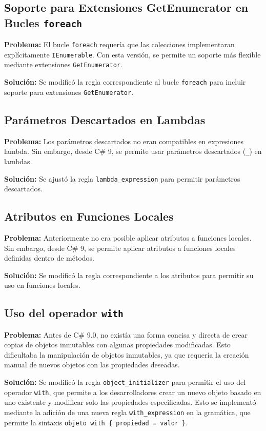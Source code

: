 \subsection*{Soporte para Extensiones GetEnumerator en Bucles \texttt{foreach}}

\textbf{Problema:} El bucle \texttt{foreach} requería que las colecciones implementaran explícitamente \texttt{IEnumerable}. Con esta versión, se permite un soporte más flexible mediante extensiones \texttt{GetEnumerator}.

\textbf{Solución:} Se modificó la regla correspondiente al bucle \texttt{foreach} para incluir soporte para extensiones \texttt{GetEnumerator}.

\subsection*{Parámetros Descartados en Lambdas}

\textbf{Problema:} Los parámetros descartados no eran compatibles en expresiones lambda. Sin embargo, desde C\# 9, se permite usar parámetros descartados (\texttt{\_}) en lambdas.

\textbf{Solución:} Se ajustó la regla \texttt{lambda\_expression} para permitir parámetros descartados.

\subsection*{Atributos en Funciones Locales}

\textbf{Problema:} Anteriormente no era posible aplicar atributos a funciones locales. Sin embargo, desde C\# 9, se permite aplicar atributos a funciones locales definidas dentro de métodos.

\textbf{Solución:} Se modificó la regla correspondiente a los atributos para permitir su uso en funciones locales.

\subsection*{Uso del operador \texttt{with}}
\textbf{Problema:} Antes de C\# 9.0, no existía una forma concisa y directa de crear copias de objetos inmutables con algunas propiedades modificadas. Esto dificultaba la manipulación de objetos inmutables, ya que requería la creación manual de nuevos objetos con las propiedades deseadas.

\textbf{Solución:} Se modificó la regla \texttt{object\_initializer} para permitir el uso del operador \texttt{with}, que permite a los desarrolladores crear un nuevo objeto basado en uno existente y modificar solo las propiedades especificadas. Esto se implementó mediante la adición de una nueva regla \texttt{with\_expression} en la gramática, que permite la sintaxis \texttt{objeto with \{ propiedad = valor \}}.

